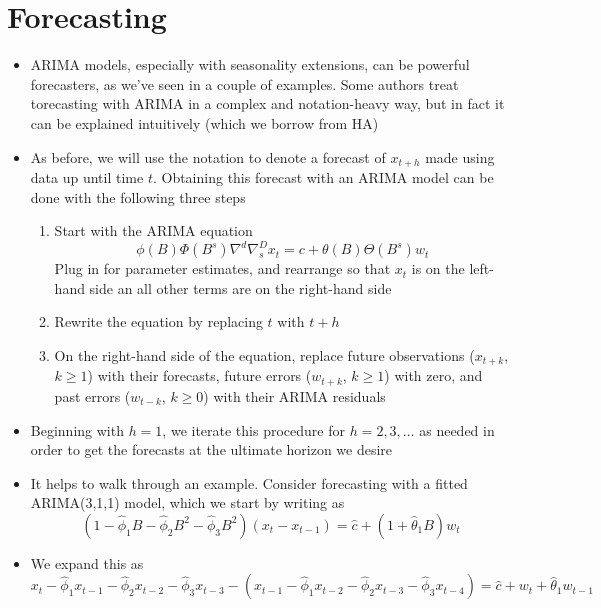 \documentclass{article}
\begin{document}
\section{Forecasting}

\begin{itemize}
\item ARIMA models, especially with seasonality extensions, can be powerful 
  forecasters, as we've seen in a couple of examples. Some authors treat
  torecasting with ARIMA in a complex and notation-heavy way, but in fact it can
  be explained intuitively (which we borrow from HA)

\item As before, we will use the notation  to denote
  a forecast of $x_{t+h}$ made using data up until time $t$. Obtaining this
  forecast with an ARIMA model can be done with the following three steps

\begin{enumerate}
\item Start with the ARIMA equation
  \begin{equation}
  \label{eq:sarima-pdq-c}
  \phi(B) \Phi(B^s) \nabla^d \nabla_s^D x_t = c + \theta(B) \Theta(B^s) w_t   
  \end{equation}
  Plug in for parameter estimates, and rearrange so that $x_t$ is on the
  left-hand side an all other terms are on the right-hand side 

\item Rewrite the equation by replacing $t$ with $t+h$

\item On the right-hand side of the equation, replace future observations
  ($x_{t+k}$, $k \geq 1$) with their forecasts, future errors ($w_{t+k}$, $k
  \geq 1$) with zero, and past errors ($w_{t-k}$, $k \geq 0$) with their ARIMA 
  residuals   
\end{enumerate}

\item Beginning with $h = 1$, we iterate this procedure for $h = 2,3,\dots$ as
  needed in order to get the forecasts at the ultimate horizon we desire  

\item It helps to walk through an example. Consider forecasting with a fitted 
  ARIMA(3,1,1) model, which we start by writing as
  \[
  (1 - \hat\phi_1 B - \hat\phi_2 B^2 - \hat\phi_3 B^2) (x_t - x_{t-1}) = \hat{c}
  + (1 + \hat\theta_1 B) w_t
  \]

\item We expand this as 
  \[
  x_t - \hat\phi_1 x_{t-1} - \hat\phi_2 x_{t-2} - \hat\phi_3 x_{t-3} - 
  (x_{t-1} - \hat\phi_1 x_{t-2} - \hat\phi_2 x_{t-3} - \hat\phi_3 x_{t-4}) = 
  \hat{c} + w_t + \hat\theta_1 w_{t-1}
  \]


\end{itemize}
\end{document}
